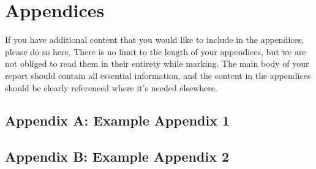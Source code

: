 \documentclass{article}
\begin{document}
 
 

\normalsize
\newpage
\section*{Appendices}
If you have additional content that you would like to include in the appendices, please do so here.
There is no limit to the length of your appendices, but we are not obliged to read them in their entirety while marking. The main body of your report should contain all essential information, and the content in the appendices should be clearly referenced where it's needed elsewhere.
\subsection*{Appendix A: Example Appendix 1}
\subsection*{Appendix B: Example Appendix 2}
\end{document}
